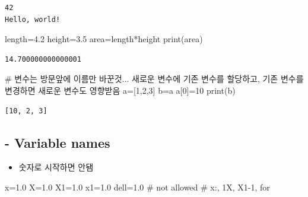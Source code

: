 \documentclass[
  letterpaper,
  DIV=11,
  numbers=noendperiod]{scrreprt}
\newenvironment{Shaded}{\begin{snugshade}}{\end{snugshade}}
\newcommand{\BuiltInTok}[1]{\textcolor[rgb]{0.00,0.23,0.31}{#1}}
\newcommand{\CommentTok}[1]{\textcolor[rgb]{0.37,0.37,0.37}{#1}}
\newcommand{\DecValTok}[1]{\textcolor[rgb]{0.68,0.00,0.00}{#1}}
\newcommand{\FloatTok}[1]{\textcolor[rgb]{0.68,0.00,0.00}{#1}}
\newcommand{\NormalTok}[1]{\textcolor[rgb]{0.00,0.23,0.31}{#1}}
\newcommand{\OperatorTok}[1]{\textcolor[rgb]{0.37,0.37,0.37}{#1}}
\providecommand{\tightlist}{%
  \setlength{\itemsep}{0pt}\setlength{\parskip}{0pt}}\usepackage{longtable,booktabs,array}
\begin{document}
\begin{verbatim}
42
Hello, world!
\end{verbatim}

\begin{Shaded}
\begin{Highlighting}[]
\NormalTok{length}\OperatorTok{=}\FloatTok{4.2}
\NormalTok{height}\OperatorTok{=}\FloatTok{3.5}
\NormalTok{area}\OperatorTok{=}\NormalTok{length}\OperatorTok{*}\NormalTok{height}
\BuiltInTok{print}\NormalTok{(area)}
\end{Highlighting}
\end{Shaded}

\begin{verbatim}
14.700000000000001
\end{verbatim}

\begin{Shaded}
\begin{Highlighting}[]
\CommentTok{\# 변수는 방문앞에 이름만 바꾼것... 새로운 변수에 기존 변수를 할당하고, 기존 변수를 변경하면 새로운 변수도 영향받음}
\NormalTok{a}\OperatorTok{=}\NormalTok{[}\DecValTok{1}\NormalTok{,}\DecValTok{2}\NormalTok{,}\DecValTok{3}\NormalTok{]}
\NormalTok{b}\OperatorTok{=}\NormalTok{a}
\NormalTok{a[}\DecValTok{0}\NormalTok{]}\OperatorTok{=}\DecValTok{10}
\BuiltInTok{print}\NormalTok{(b)}
\end{Highlighting}
\end{Shaded}

\begin{verbatim}
[10, 2, 3]
\end{verbatim}

\subsection{- Variable names}\label{variable-names}

\begin{itemize}
\tightlist
\item
  숫자로 시작하면 안됌
\end{itemize}

\begin{Shaded}
\begin{Highlighting}[]
\NormalTok{x}\OperatorTok{=}\FloatTok{1.0}
\NormalTok{X}\OperatorTok{=}\FloatTok{1.0}
\NormalTok{X1}\OperatorTok{=}\FloatTok{1.0}
\NormalTok{x1}\OperatorTok{=}\FloatTok{1.0}
\NormalTok{dell}\OperatorTok{=}\FloatTok{1.0}
\CommentTok{\# not allowed}
\CommentTok{\# x:, 1X, X1{-}1, for}
\end{Highlighting}
\end{Shaded}
\end{document}

